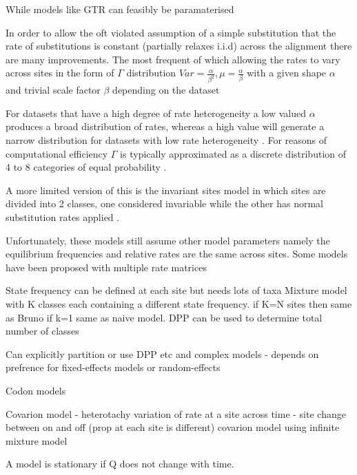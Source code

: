 While models like GTR can feasibly be paramaterised 

In order to allow the oft violated assumption of a simple substitution that the rate of substitutions is constant (partially relaxes i.i.d)
across the alignment there are many improvements.  The most frequent of which allowing the rates to vary across
sites in the form of \(\Gamma\) distribution \(Var = \frac{\alpha}{\beta^{2}}, \mu = \frac{\alpha}{\beta}\) with a given shape \(\alpha\) and 
trivial scale factor \(\beta\) depending on the dataset 

For datasets that have a high degree
of rate heterogeneity a low valued \(\alpha\) produces a broad distribution of rates, whereas a high value will generate 
a narrow distribution for datasets with low rate heterogeneity \citep{Yang1993}.
For reasons of computational efficiency \(\Gamma\) is typically approximated as a discrete distribution of 4 to 8 
categories of equal probability \citep{Yang1994a}. 

A more limited version of this is the invariant sites model in which sites are divided into 2 classes, one considered invariable while the 
other has normal substitution rates applied \citep{Hasegawa1985}.

Unfortunately, these models still assume other model parameters namely the equilibrium frequencies and relative rates are the same across
sites.  Some models have been proposed with multiple rate matrices  \citep{Lartillot2004}



State frequency can be defined at each site \citep{Bruno1996} but needs lots of taxa \citep{Lartillot2004}
Mixture model with K classes each containing a different state frequency. if K=N sites then same as Bruno
if k=1 same as naive model.  DPP can be used to determine total number of classes \citep{Lartillot2004}


Can explicitly partition or use DPP etc and complex models - depends on prefrence for fixed-effects models or random-effects
\citep{Yang2012}


Codon models


Covarion model - heterotachy  variation of rate at a site across time  - site change between on and off (prop at each site is different)
covarion model using infinite mixture model\citep{Zhou2010} 








A model is stationary if Q does not change with time.


